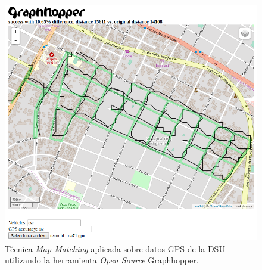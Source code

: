 \begin{figure}[htbp]
    \centering
    \includegraphics[width=\textwidth]{graphhopper71.png}
    \caption{Técnica \textit{Map Matching} aplicada sobre datos GPS de la DSU utilizando la herramienta \textit{Open Source} Graphhopper.}
    \label{fig:mapMatching}
\end{figure}

